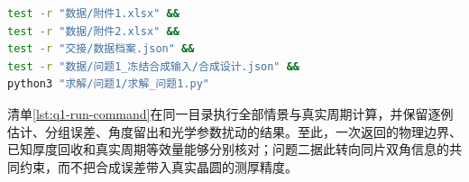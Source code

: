 \begin{lstlisting}[language=bash,caption={全部情景与真实周期的执行命令},label={lst:q1-run-command}]
test -r "数据/附件1.xlsx" &&
test -r "数据/附件2.xlsx" &&
test -r "交接/数据档案.json" &&
test -r "数据/问题1_冻结合成输入/合成设计.json" &&
python3 "求解/问题1/求解_问题1.py"
\end{lstlisting}
\endgroup

清单\ref{lst:q1-run-command}在同一目录执行全部情景与真实周期计算，并保留逐例估计、分组误差、角度留出和光学参数扰动的结果。至此，一次返回的物理边界、已知厚度回收和真实周期等效量能够分别核对；问题二据此转向同片双角信息的共同约束，而不把合成误差带入真实晶圆的测厚精度。
